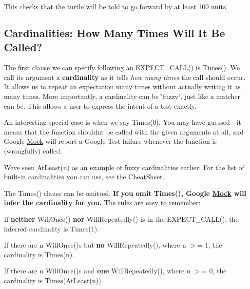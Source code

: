\begin{DoxyCode}{0}
\end{DoxyCode}


This checks that the turtle will be told to go forward by at least 100 units.

\subsection*{Cardinalities\+: How Many Times Will It Be Called?}

The first clause we can specify following an {\ttfamily E\+X\+P\+E\+C\+T\+\_\+\+C\+A\+L\+L()} is {\ttfamily Times()}. We call its argument a {\bfseries{cardinality}} as it tells {\itshape how many times} the call should occur. It allows us to repeat an expectation many times without actually writing it as many times. More importantly, a cardinality can be \char`\"{}fuzzy\char`\"{}, just like a matcher can be. This allows a user to express the intent of a test exactly.

An interesting special case is when we say {\ttfamily Times(0)}. You may have guessed -\/ it means that the function shouldn\textquotesingle{}t be called with the given arguments at all, and Google \mbox{\hyperlink{class_mock}{Mock}} will report a Google Test failure whenever the function is (wrongfully) called.

We\textquotesingle{}ve seen {\ttfamily At\+Least(n)} as an example of fuzzy cardinalities earlier. For the list of built-\/in cardinalities you can use, see the Cheat\+Sheet.

The {\ttfamily Times()} clause can be omitted. {\bfseries{If you omit {\ttfamily Times()}, Google \mbox{\hyperlink{class_mock}{Mock}} will infer the cardinality for you.}} The rules are easy to remember\+:


\begin{DoxyItemize}
\item If {\bfseries{neither}} {\ttfamily Will\+Once()} {\bfseries{nor}} {\ttfamily Will\+Repeatedly()} is in the {\ttfamily E\+X\+P\+E\+C\+T\+\_\+\+C\+A\+L\+L()}, the inferred cardinality is {\ttfamily Times(1)}.
\item If there are {\ttfamily n Will\+Once()}\textquotesingle{}s but {\bfseries{no}} {\ttfamily Will\+Repeatedly()}, where {\ttfamily n} $>$= 1, the cardinality is {\ttfamily Times(n)}.
\item If there are {\ttfamily n Will\+Once()}\textquotesingle{}s and {\bfseries{one}} {\ttfamily Will\+Repeatedly()}, where {\ttfamily n} $>$= 0, the cardinality is {\ttfamily Times(\+At\+Least(n))}.
\end{DoxyItemize}

